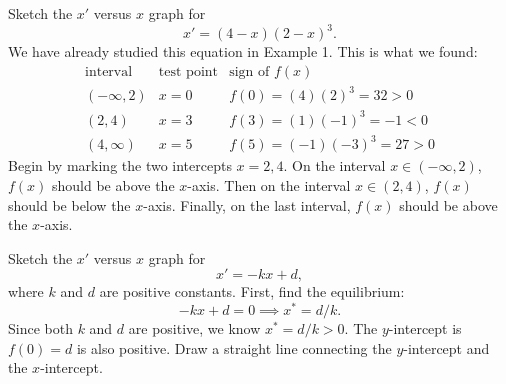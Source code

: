 \documentclass[09pt,letterpaper]{article}
\begin{document}
\begin{example}[7]{
Sketch the $x'$ versus $x$ graph for 
$$x'=(4-x)(2-x)^3.$$
}
We have already studied this equation in Example 1. This is what we found:
\[
\begin{array}{c|c|c}
\text{interval} & \text{test point} & \text{sign of }f(x) \\
\hline
(-\infty,2) & x=0 & f(0)=(4)(2)^3=32>0 \\
(2,4) & x=3 & f(3)=(1)(-1)^3=-1<0 \\
(4,\infty) & x=5 & f(5)=(-1)(-3)^3=27>0
\end{array}
\]   
Begin by marking the two intercepts $x=2,4$. On the interval $x\in(-\infty,2)$, $f(x)$ should be above the $x$-axis. Then on the interval $x\in(2,4)$, $f(x)$ should be below the $x$-axis. Finally, on the last interval, $f(x)$ should be above the $x$-axis.

\begin{figure}[H]
\centering
{}
\end{figure}
\end{example}

\begin{example}[8]{
Sketch the $x'$ versus $x$ graph for 
$$x'=-kx+d,$$
where $k$ and $d$ are positive constants.
}
First, find the equilibrium: 
$$
    -kx+d=0\implies x^* = d/k.
$$
Since both $k$ and $d$ are positive, we know $x^*=d/k>0$. The $y$-intercept is $f(0)=d$ is also positive. Draw a straight line connecting the $y$-intercept and the $x$-intercept. 

\begin{figure}[H]
\centering
{}
\end{figure}
\end{example}
\end{document}
